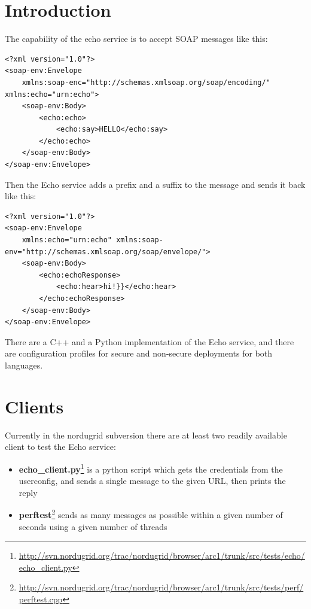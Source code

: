 \documentclass{article}
\renewcommand{\thefootnote}{\fnsymbol{footnote}}
\begin{document}
\newpage

\renewcommand{\thefootnote}{\arabic{footnote}}



\section{Introduction} %
\label{sec:introduction}
The capability of the echo service is to accept SOAP messages like this:
\begin{verbatim}
<?xml version="1.0"?>
<soap-env:Envelope
	xmlns:soap-enc="http://schemas.xmlsoap.org/soap/encoding/" xmlns:echo="urn:echo">
    <soap-env:Body>
        <echo:echo>
            <echo:say>HELLO</echo:say>
        </echo:echo>
    </soap-env:Body>
</soap-env:Envelope>
\end{verbatim}
Then the Echo service adds a prefix and a suffix to the message and sends it back like this:
\begin{verbatim}
<?xml version="1.0"?> 
<soap-env:Envelope
	xmlns:echo="urn:echo" xmlns:soap-env="http://schemas.xmlsoap.org/soap/envelope/">
    <soap-env:Body>
        <echo:echoResponse>
            <echo:hear>hi!}}</echo:hear>
        </echo:echoResponse>
    </soap-env:Body>
</soap-env:Envelope>
\end{verbatim}
There are a C++ and a Python implementation of the Echo service, and there are configuration profiles for secure and non-secure deployments for both languages.

\section{Clients} %
\label{sec:clients}
Currently in the nordugrid subversion there are at least two readily available client to test the Echo service:
\begin{itemize}
	\item \textbf{echo\_client.py}\footnote{\url{http://svn.nordugrid.org/trac/nordugrid/browser/arc1/trunk/src/tests/echo/echo_client.py}} is a python script which gets the credentials from the userconfig, and sends a single message to the given URL, then prints the reply
	\item \textbf{perftest}\footnote{\url{http://svn.nordugrid.org/trac/nordugrid/browser/arc1/trunk/src/tests/perf/perftest.cpp}} sends as many messages as possible within a given number of seconds using a given number of threads
\end{itemize}
\end{document}
